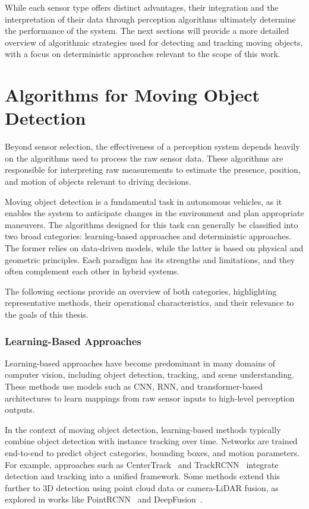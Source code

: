 While each sensor type offers distinct advantages, their integration and the interpretation of their 
data through perception algorithms ultimately determine the performance of the system. The next sections 
will provide a more detailed overview of algorithmic strategies used for detecting and tracking moving 
objects, with a focus on deterministic approaches relevant to the scope of this work.


\section{Algorithms for Moving Object Detection}\label{sec:AlgorithmsForMovingObjectDetection}
\label{sec:algorithms_for_moving_object_detection}

Beyond sensor selection, the effectiveness of a perception system depends heavily on the algorithms 
used to process the raw sensor data. These algorithms are 
responsible for interpreting raw measurements to estimate the presence, position, and motion of 
objects relevant to driving decisions.

Moving object detection is a fundamental task in autonomous vehicles, as it enables the system 
to anticipate changes in the environment and plan appropriate maneuvers. The algorithms designed 
for this task can generally be classified into two broad categories: learning-based approaches 
and deterministic approaches. The former relies on data-driven models, while the latter is based 
on physical and geometric principles. Each paradigm has its strengths and limitations, and they 
often complement each other in hybrid systems.

The following sections provide an overview of both categories, highlighting representative methods, 
their operational characteristics, and their relevance to the goals of this thesis.

\subsubsection{Learning-Based Approaches}
\label{sec:learning_based_approaches}

Learning-based approaches have become predominant in many domains of computer vision, including 
object detection, tracking, and scene understanding. These methods use models such as 
\gls{CNN}, \gls{RNN}, and transformer-based 
architectures to learn mappings from raw sensor inputs to high-level perception outputs.

In the context of moving object detection, learning-based methods typically combine object detection 
with instance tracking over time. Networks are trained end-to-end to predict object categories, 
bounding boxes, and motion parameters. For example, approaches such as CenterTrack~\cite{centerTrack} 
and TrackRCNN~\cite{trackRCNN} integrate detection and tracking into a unified framework. Some methods 
extend this further to 3D detection using point cloud data or camera-LiDAR fusion, as explored 
in works like PointRCNN~\cite{pointRCNN} and DeepFusion~\cite{deepFusion}.

